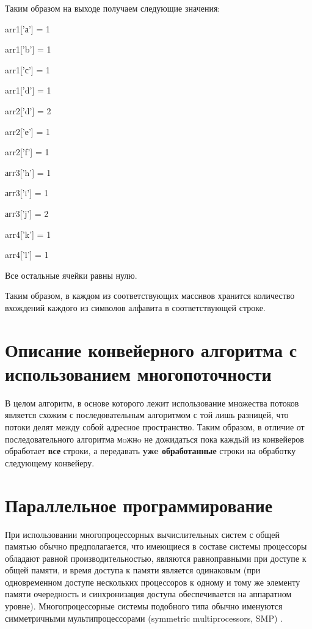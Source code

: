 \documentclass[12pt]{report}
\begin{document}
Таким  образом  на  выходе  получаем  следующие  значения:

\begin{center}
arr1[’а’] = 1

arr1[’b’] = 1

arr1[’с’] = 1

arr1[’d'] = 1

arr2[’d'] = 2

arr2[’е'] = 1

arr2[’f'] = 1

агг3[’h'] = 1

агг3[’i’] = 1

агг3[’ј'] = 2

arr4[’k'] = 1

arr4[’l’] = 1
\end{center}

Все остальные  ячейки  равны  нулю.

Таким образом, в каждом из соответствующих массивов хранится количество вхождений каждого из символов алфавита в соответствующей строке.

\section{Описание конвейерного алгоритма  с использованием  многопоточности}

В целом алгоритм,  в основе которого  лежит использование  множества  потоков  является схожим с 
последовательным алгоритмом  с той лишь разницей,  что потоки делят между собой  адресное  
пространство.  Таким  образом,  в отличие  от  последовательного алгоритма мoжнo  не  дожидаться  
пока  каждьiй  из  конвейеров  обработает  \textbf{все}   строки,  а  передавать \textbf{yжe    обработанные}  строки 
на обработку  следующему  конвейеру.

\section{Параллельное программирование}

При использовании многопроцессорных вычислительных систем с общей памятью обычно предполагается, что имеющиеся в составе системы процессоры обладают равной производительностью, являются равноправными при доступе к общей памяти, и время доступа к памяти является одинаковым (при одновременном доступе нескольких процессоров к одному и тому же элементу памяти очередность и синхронизация доступа обеспечивается на аппаратном уровне). Многопроцессорные системы подобного типа обычно именуются симметричными мультипроцессорами (symmetric multiprocessors, SMP) \cite{tri}.
\end{document}
